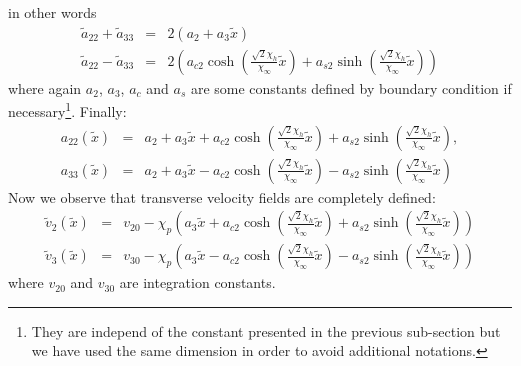\documentclass[
10pt, %
a4paper, %
oneside, %
headinclude,footinclude, %
table
]{scrartcl}
\begin{document}
in other words
$$
\begin{array}{rcl}
\tilde{a}_{22}+\tilde{a}_{33}&=&2(a_{2}+a_{3} \tilde{x})\\
\tilde{a}_{22}-\tilde{a}_{33}&=&2\left(a_{c2} \cosh \left(\frac{\sqrt{2}  \chi _h}{\chi
   _{\infty }}\tilde{x}\right)+a_{s2} \sinh \left(\frac{\sqrt{2} \chi _h}{\chi _{\infty
   }}\tilde{x} \right)\right)
\end{array}
$$
where again $a_{2}$, $a_{3}$, $a_{c}$ and $a_{s}$ are some constants defined by boundary condition if necessary\footnote{They are independ of the constant presented in the previous sub-section but we have used the same dimension in order to avoid additional notations.}. Finally:
$$
\begin{array}{rcl}
a_{22}(\tilde{x}) &=&a_{2}+a_{3} \tilde{x}+a_{c2} \cosh (\frac{\sqrt{2}  \chi _h}{\chi
   _{\infty }}\tilde{x})+a_{s2} \sinh (\frac{\sqrt{2} \chi _h}{\chi _{\infty
   }}\tilde{x} ),
\\
a_{33}(\tilde{x}) &=&a_{2}+a_{3} \tilde{x}-a_{c2} \cosh (\frac{\sqrt{2}\chi _h}{\chi
   _{\infty }} \tilde{x} )-a_{s2} \sinh (\frac{\sqrt{2} \chi _h}{\chi _{\infty
   }}\tilde{x} )
\end{array} 
$$
Now we observe that transverse velocity fields are completely defined:
$$
\begin{array}{rcl}
\tilde{v}_{2}(\tilde{x}) &=&v_{20}-\chi _p \left(a_{3} \tilde{x}+a_{c2} \cosh (\frac{\sqrt{2} 
   \chi _h}{\chi _{\infty }}\tilde{x})+a_{s2} \sinh (\frac{\sqrt{2} \chi _h}{\chi
   _{\infty }}\tilde{x}) \right)
 \\
\tilde{v}_{3}(\tilde{x}) &=&v_{30}-\chi _p \left(a_{3} \tilde{x}-a_{c2} \cosh
   (\frac{\sqrt{2}  \chi _h}{\chi _{\infty }}\tilde{x})-a_{s2} \sinh
   (\frac{\sqrt{2}  \chi _h}{\chi _{\infty }}\tilde{x})\right)
\end{array} 
$$
where $v_{20}$ and $v_{30}$ are integration constants.

\end{document}
